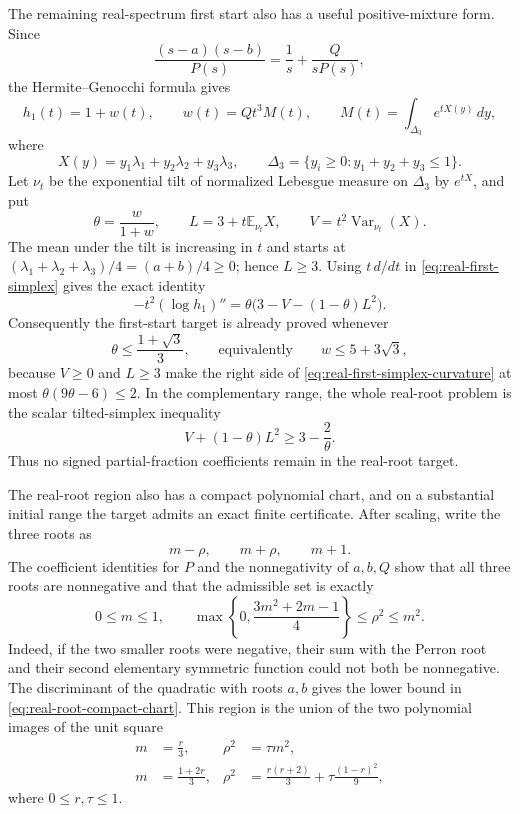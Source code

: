 \documentclass[11pt]{article}
\newcommand{\E}{\mathbb E}
\theoremstyle{remark}
\begin{document}
The remaining real-spectrum first start also has a useful positive-mixture
form.  Since
\[
 \frac{(s-a)(s-b)}{P(s)}=\frac1s+\frac{Q}{sP(s)},
\]
the Hermite--Genocchi formula gives
\begin{equation}\label{eq:real-first-simplex}
 h_1(t)=1+w(t),\qquad
 w(t)=Qt^3M(t),\qquad
 M(t)=\int_{\Delta_3}e^{tX(y)}\,dy,
\end{equation}
where
\[
 X(y)=y_1\lambda_1+y_2\lambda_2+y_3\lambda_3,
 \qquad
 \Delta_3=\{y_i\geq0:y_1+y_2+y_3\leq1\}.
\]
Let $\nu_t$ be the exponential tilt of normalized Lebesgue measure on
$\Delta_3$ by $e^{tX}$, and put
\[
 \theta=\frac{w}{1+w},\qquad
 L=3+t\E_{\nu_t}X,\qquad
 V=t^2\operatorname{Var}_{\nu_t}(X).
\]
The mean under the tilt is increasing in $t$ and starts at
$(\lambda_1+\lambda_2+\lambda_3)/4=(a+b)/4\geq0$; hence $L\geq3$.
Using $t\,d/dt$ in \eqref{eq:real-first-simplex} gives the exact identity
\begin{equation}\label{eq:real-first-simplex-curvature}
 -t^2(\log h_1)''
 =\theta\bigl(3-V-(1-\theta)L^2\bigr).
\end{equation}
Consequently the first-start target is already proved whenever
\[
 \theta\leq\frac{1+\sqrt3}{3},
 \qquad\text{equivalently}\qquad
 w\leq5+3\sqrt3,
\]
because $V\geq0$ and $L\geq3$ make the right side of
\eqref{eq:real-first-simplex-curvature} at most
$\theta(9\theta-6)\leq2$.  In the complementary range, the whole real-root
problem is the scalar tilted-simplex inequality
\begin{equation}\label{eq:real-first-simplex-target}
 V+(1-\theta)L^2\geq3-\frac2\theta.
\end{equation}
Thus no signed partial-fraction coefficients remain in the real-root target.

The real-root region also has a compact polynomial chart, and on a substantial
initial range the target admits an exact finite certificate.  After scaling,
write the three roots as
\[
 m-\rho,\qquad m+\rho,\qquad m+1.
\]
The coefficient identities for $P$ and the nonnegativity of $a,b,Q$ show that
all three roots are nonnegative and that the admissible set is exactly
\begin{equation}\label{eq:real-root-compact-chart}
 0\leq m\leq1,\qquad
 \max\left\{0,\frac{3m^2+2m-1}{4}\right\}
 \leq\rho^2\leq m^2.
\end{equation}
Indeed, if the two smaller roots were negative, their sum with the Perron
root and their second elementary symmetric function could not both be
nonnegative.  The discriminant of the quadratic with roots $a,b$ gives the
lower bound in \eqref{eq:real-root-compact-chart}.  This region is the union
of the two polynomial images of the unit square
\begin{align}
 m&=\frac r3,&
 \rho^2&=\tau m^2,\label{eq:real-root-low-rectangle}\\
 m&=\frac{1+2r}{3},&
 \rho^2&=\frac{r(r+2)}3+\tau\frac{(1-r)^2}{9},
 \label{eq:real-root-high-rectangle}
\end{align}
where $0\leq r,\tau\leq1$.
\end{document}
